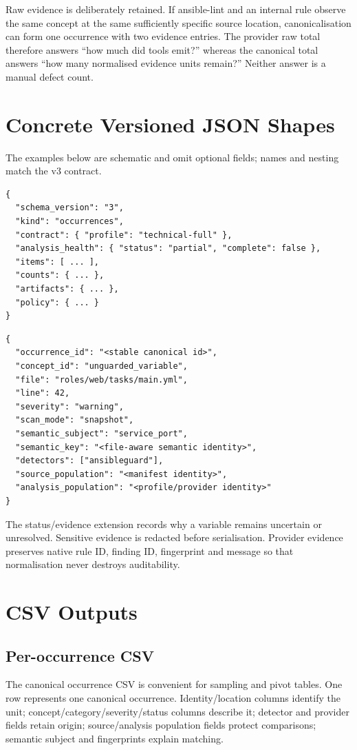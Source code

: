 Raw evidence is deliberately retained. If ansible-lint and an internal rule
observe the same concept at the same sufficiently specific source location,
canonicalisation can form one occurrence with two evidence entries. The
provider raw total therefore answers ``how much did tools emit?'' whereas the
canonical total answers ``how many normalised evidence units remain?'' Neither
answer is a manual defect count.

\section{Concrete Versioned JSON Shapes}
The examples below are schematic and omit optional fields; names and nesting
match the v3 contract.

\begin{lstlisting}[language={},basicstyle=\ttfamily\footnotesize]
{
  "schema_version": "3",
  "kind": "occurrences",
  "contract": { "profile": "technical-full" },
  "analysis_health": { "status": "partial", "complete": false },
  "items": [ ... ],
  "counts": { ... },
  "artifacts": { ... },
  "policy": { ... }
}
\end{lstlisting}

\begin{lstlisting}[language={},basicstyle=\ttfamily\footnotesize]
{
  "occurrence_id": "<stable canonical id>",
  "concept_id": "unguarded_variable",
  "file": "roles/web/tasks/main.yml",
  "line": 42,
  "severity": "warning",
  "scan_mode": "snapshot",
  "semantic_subject": "service_port",
  "semantic_key": "<file-aware semantic identity>",
  "detectors": ["ansibleguard"],
  "source_population": "<manifest identity>",
  "analysis_population": "<profile/provider identity>"
}
\end{lstlisting}

The status/evidence extension records why a variable remains uncertain or
unresolved. Sensitive evidence is redacted before serialisation. Provider
evidence preserves native rule ID, finding ID, fingerprint and message so that
normalisation never destroys auditability.

\section{CSV Outputs}
\subsection{Per-occurrence CSV}
The canonical occurrence CSV is convenient for sampling and pivot tables. One
row represents one canonical occurrence. Identity/location columns identify
the unit; concept/category/severity/status columns describe it; detector and
provider fields retain origin; source/analysis population fields protect
comparisons; semantic subject and fingerprints explain matching.

